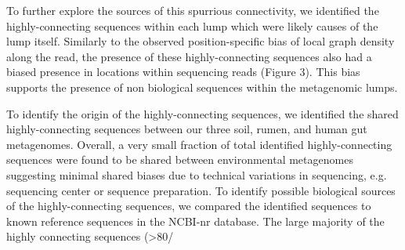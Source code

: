 \documentclass[11pt]{article} %
\begin{document}
To further explore the sources of this spurrious connectivity, we identified the highly-connecting sequences within each lump which were likely causes of the lump itself.  Similarly to the observed position-specific bias of local graph density along the read, the presence of these highly-connecting sequences also had a biased presence in locations within sequencing reads (Figure 3).  This bias supports the presence of non biological sequences within the metagenomic lumps.

To identify the origin of the highly-connecting sequences, we identified the shared highly-connecting sequences between our three soil, rumen, and human gut metagenomes.  Overall, a very small fraction of total identified highly-connecting sequences were found to be shared between environmental metagenomes suggesting minimal shared biases due to technical variations in sequencing, e.g. sequencing center or sequence preparation.  To identify possible biological sources of the highly-connecting sequences, we compared the identified sequences to known reference sequences in the NCBI-nr database.  The large majority of the highly connecting sequences (>80/%
\end{document}
